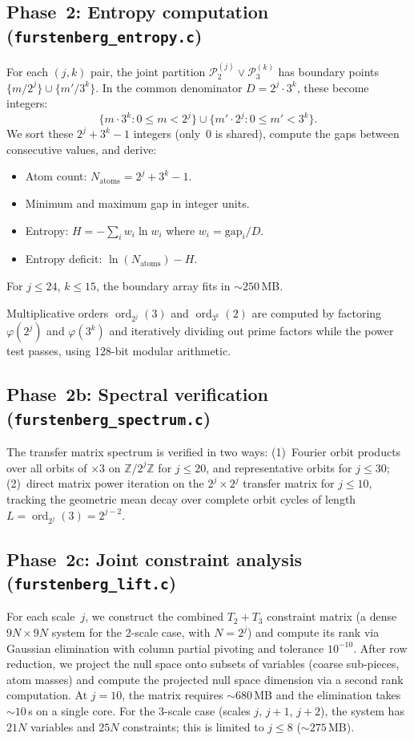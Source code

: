 \documentclass[11pt,a4paper]{article}
\DeclareMathOperator{\ord}{ord}
\begin{document}
\subsection{Phase~2: Entropy computation (\texttt{furstenberg\_entropy.c})}

For each $(j, k)$ pair, the joint partition
$\mathcal{P}_2^{(j)} \vee \mathcal{P}_3^{(k)}$ has boundary points
$\{m/2^j\} \cup \{m'/3^k\}$.
In the common denominator $D = 2^j \cdot 3^k$, these become integers:
\[
\{m \cdot 3^k : 0 \leq m < 2^j\} \cup \{m' \cdot 2^j : 0 \leq m' < 3^k\}.
\]
We sort these $2^j + 3^k - 1$ integers (only~0 is shared), compute the
gaps between consecutive values, and derive:
\begin{itemize}
\item Atom count: $N_{\text{atoms}} = 2^j + 3^k - 1$.
\item Minimum and maximum gap in integer units.
\item Entropy: $H = -\sum_i w_i \ln w_i$ where $w_i = \text{gap}_i / D$.
\item Entropy deficit: $\ln(N_{\text{atoms}}) - H$.
\end{itemize}
For $j \leq 24$, $k \leq 15$, the boundary array fits in $\sim 250$\,MB.

Multiplicative orders $\ord_{2^j}(3)$ and $\ord_{3^k}(2)$ are computed
by factoring $\varphi(2^j)$ and $\varphi(3^k)$ and iteratively dividing
out prime factors while the power test passes, using 128-bit modular
arithmetic.

\subsection{Phase~2b: Spectral verification (\texttt{furstenberg\_spectrum.c})}

The transfer matrix spectrum is verified in two ways:
(1)~Fourier orbit products over all orbits of $\times 3$ on
$\mathbb{Z}/2^j\mathbb{Z}$ for $j \leq 20$, and representative orbits
for $j \leq 30$;
(2)~direct matrix power iteration on the $2^j \times 2^j$ transfer
matrix for $j \leq 10$, tracking the geometric mean decay over complete
orbit cycles of length $L = \ord_{2^j}(3) = 2^{j-2}$.

\subsection{Phase~2c: Joint constraint analysis (\texttt{furstenberg\_lift.c})}

For each scale~$j$, we construct the combined $T_2 + T_3$ constraint
matrix (a dense $9N \times 9N$ system for the 2-scale case, with
$N = 2^j$) and compute its rank via Gaussian elimination with column
partial pivoting and tolerance $10^{-10}$.
After row reduction, we project the null space onto subsets of variables
(coarse sub-pieces, atom masses) and compute the projected null space
dimension via a second rank computation.
At $j = 10$, the matrix requires ${\sim}680$\,MB and the elimination
takes ${\sim}10$\,s on a single core.
For the 3-scale case (scales $j$, $j+1$, $j+2$), the system has
$21N$ variables and $25N$ constraints; this is limited to $j \leq 8$
(${\sim}275$\,MB).
\end{document}
